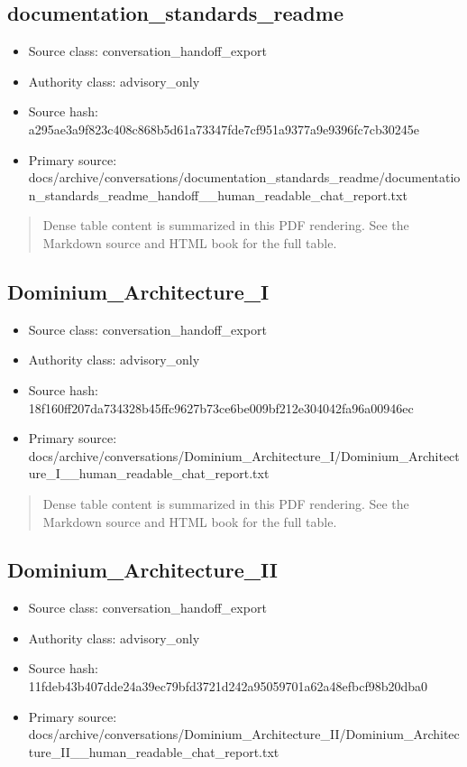 \documentclass[11pt,a4paper]{report}
\begin{document}
\subsection{documentation\_standards\_readme}

\begin{itemize}
\item Source class: conversation\_handoff\_export
\item Authority class: advisory\_only
\item Source hash: a295ae3a9f823c408c868b5d61a73347fde7cf951a9377a9e9396fc7cb30245e
\item Primary source: docs/archive/conversations/documentation\_standards\_readme/documentation\_standards\_readme\_handoff\_\_human\_readable\_chat\_report.txt
\end{itemize}

\begin{quote}\small Dense table content is summarized in this PDF rendering. See the Markdown source and HTML book for the full table.\end{quote}

\subsection{Dominium\_Architecture\_I}

\begin{itemize}
\item Source class: conversation\_handoff\_export
\item Authority class: advisory\_only
\item Source hash: 18f160ff207da734328b45ffc9627b73ce6be009bf212e304042fa96a00946ec
\item Primary source: docs/archive/conversations/Dominium\_Architecture\_I/Dominium\_Architecture\_I\_\_human\_readable\_chat\_report.txt
\end{itemize}

\begin{quote}\small Dense table content is summarized in this PDF rendering. See the Markdown source and HTML book for the full table.\end{quote}

\subsection{Dominium\_Architecture\_II}

\begin{itemize}
\item Source class: conversation\_handoff\_export
\item Authority class: advisory\_only
\item Source hash: 11fdeb43b407dde24a39ec79bfd3721d242a95059701a62a48efbcf98b20dba0
\item Primary source: docs/archive/conversations/Dominium\_Architecture\_II/Dominium\_Architecture\_II\_\_human\_readable\_chat\_report.txt
\end{itemize}
\end{document}
